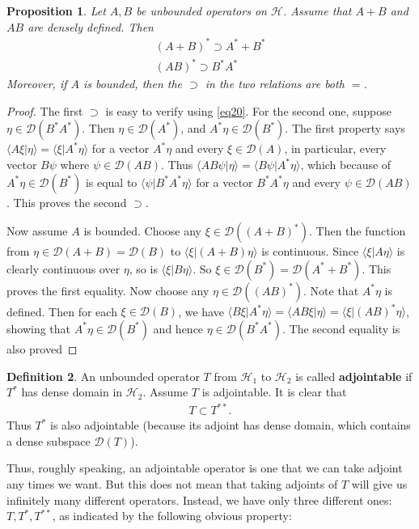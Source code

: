 \documentclass[12pt,b5paper,notitlepage]{article}
\theoremstyle{definition}
\newtheorem{df}{Definition}[section]
\theoremstyle{plain}
\newtheorem{pp}[df]{Proposition}
\newcommand{\mc}{\mathcal}
\newcommand{\Dom}{\scr D}
\newcommand{\bk}[1]{\langle {#1}\rangle}
\newcommand{\scr}{\mathscr}
\numberwithin{equation}{section}
\begin{document}
\begin{pp}\label{lb9}
Let $A,B$ be unbounded operators on $\mc H$. Assume that $A+B$ and $AB$ are densely defined. Then
\begin{gather*}
(A+B)^*\supset A^*+B^*\\
(AB)^*\supset B^*A^*
\end{gather*}
Moreover, if $A$ is bounded, then the $\supset$ in the two relations are both $=$.
\end{pp}


\begin{proof}
The first $\supset$ is easy to verify using \eqref{eq20}. For the second one, suppose $\eta\in\Dom(B^*A^*)$. Then $\eta\in\Dom(A^*)$, and $A^*\eta\in\Dom(B^*)$. The first property says $\bk{A\xi|\eta}=\bk{\xi|A^*\eta}$ for a vector $A^*\eta$ and every $\xi\in\Dom(A)$, in particular, every vector $B\psi$ where $\psi\in\Dom(AB)$. Thus $\bk{AB\psi|\eta}=\bk{B\psi|A^*\eta}$, which because of $A^*\eta\in\Dom(B^*)$ is equal to $\bk{\psi|B^*A^*\eta}$ for a vector $B^*A^*\eta$ and every $\psi\in\Dom(AB)$. This proves the second $\supset$.

Now assume $A$ is bounded. Choose any $\xi\in\Dom((A+B)^*)$. Then the function from $\eta\in\Dom(A+B)=\Dom(B)$ to $\bk{\xi|(A+B)\eta}$ is continuous. Since $\bk{\xi|A\eta}$ is clearly continuous over $\eta$, so is $\bk{\xi|B\eta}$. So $\xi\in\Dom(B^*)=\Dom(A^*+B^*)$. This proves the first equality. Now choose any $\eta\in\Dom((AB)^*)$. Note that $A^*\eta$ is defined. Then for each  $\xi\in\Dom(B)$, we have $\bk{B\xi|A^*\eta}=\bk{AB\xi|\eta}=\bk{\xi|(AB)^*\eta}$, showing that $A^*\eta\in\Dom(B^*)$ and hence $\eta\in\Dom(B^*A^*)$. The second equality is also proved
\end{proof}




\begin{df}
An unbounded operator $T$ from $\mc H_1$ to $\mc H_2$ is called \textbf{adjointable}  if $T^*$ has dense domain in $\mc H_2$. Assume $T$ is adjointable. It is clear that
\begin{align}
T\subset T^{**}.	
\end{align}
Thus $T^*$ is also adjointable (because its adjoint has dense domain, which contains a dense subspace $\Dom(T)$).
\end{df}

Thus, roughly speaking, an adjointable operator is one that we can take adjoint any times we want. But this does not mean that taking adjoints of $T$ will give us infinitely many different operators. Instead, we have only three different ones: $T,T^*,T^{**}$, as indicated by the following obvious property:
\end{document}
